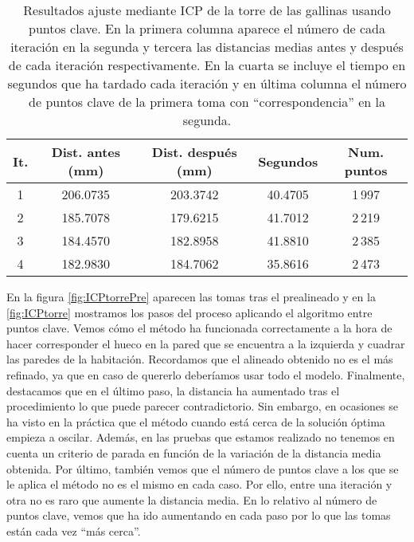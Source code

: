 \begin{table}[h!]
	\centering
	\begin{tabular}{| c | c | c | c | c |} 
		\hline
		It. & Dist. antes (mm) & Dist. después (mm) & Segundos & Num. puntos \\
		\hline
		1 &  206.0735 & 203.3742 & 40.4705 & 1\,997 \\				  
		2 & 185.7078 & 179.6215 & 41.7012 & 2\,219  \\	
		3 & 184.4570 & 182.8958  & 41.8810 &  2\,385 \\
		4 & 182.9830 &  184.7062 & 35.8616 & 2\,473\\
		\hline
	\end{tabular}
	\caption{Resultados ajuste mediante ICP de la torre de las gallinas usando puntos clave. En la primera columna aparece el número de cada iteración en la segunda y tercera las distancias medias antes y después de cada iteración respectivamente. En la cuarta se incluye el tiempo en segundos que ha tardado cada iteración y en última columna el número de puntos clave de la primera toma con ``correspondencia'' en la segunda.}
\end{table}
En la figura \ref{fig:ICPtorrePre} aparecen las tomas tras el prealineado y en la \ref{fig:ICPtorre} mostramos los pasos del proceso aplicando el algoritmo entre puntos clave. Vemos cómo el método ha funcionada correctamente a la hora de hacer corresponder el hueco en la pared que se encuentra a la izquierda y cuadrar las paredes de la habitación. Recordamos que el alineado obtenido no es el más refinado, ya que en caso de quererlo deberíamos usar todo el modelo. Finalmente, destacamos que en el último paso, la distancia ha aumentado tras el procedimiento lo que puede parecer contradictorio. Sin embargo, en ocasiones se ha visto en la práctica que el método cuando está cerca de la solución óptima empieza a oscilar. Además,  en las pruebas que estamos realizado no tenemos en cuenta un criterio de parada en función de la variación de la distancia media obtenida. Por último, también vemos que el número de puntos clave a los que se le aplica el método no es el mismo en cada caso. Por ello, entre una iteración y otra no es raro que aumente la distancia media. En lo relativo al número de puntos clave, vemos que ha ido aumentando en cada paso por lo que las tomas están cada vez ``más cerca''.

